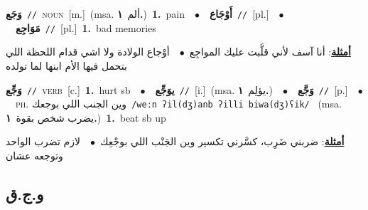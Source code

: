 \documentclass[10pt,a4paper,twoside]{article} %
\begin{document}
\begin{multicols}{2}
{{{{{{{{{{{\setlength\topsep{0pt}\textbf{\foreignlanguage{arabic}{وَجَع}}\ {\color{gray}\texttt{//}\color{black}}\ \textsc{noun}\ [m.]\ \color{gray}(msa. \foreignlanguage{arabic}{ألم}~\foreignlanguage{arabic}{\textbf{١.}})\color{black}\ \textbf{1.}~pain\ \ $\bullet$\ \ \setlength\topsep{0pt}\textbf{\foreignlanguage{arabic}{أَوْجَاع}}\ {\color{gray}\texttt{//}\color{black}}\ [pl.]\ \ $\bullet$\ \ \setlength\topsep{0pt}\textbf{\foreignlanguage{arabic}{مَوَاجِع}}\ {\color{gray}\texttt{//}\color{black}}\ [pl.]\ \textbf{1.}~bad memories\  \begin{flushright}\color{gray}\foreignlanguage{arabic}{\textbf{\underline{\foreignlanguage{arabic}{أمثلة}}}: أنا آسف لأني قلَّبت عليك المواجِع\ $\bullet$\ \  أوْجاع الولادة ولا اشي قدام اللحظة اللي بتحمل فيها الأم ابنها لما تولده}\end{flushright}\color{black}} \vspace{2mm}

{\setlength\topsep{0pt}\textbf{\foreignlanguage{arabic}{وَجِّع}}\ {\color{gray}\texttt{//}\color{black}}\ \textsc{verb}\ [c.]\ \textbf{1.}~hurt sb\ \ $\bullet$\ \ \setlength\topsep{0pt}\textbf{\foreignlanguage{arabic}{يوَجِّع}}\ {\color{gray}\texttt{//}\color{black}}\ [i.]\ \color{gray}(msa. \foreignlanguage{arabic}{يؤلِم}~\foreignlanguage{arabic}{\textbf{١.}})\color{black}\ \ $\bullet$\ \ \setlength\topsep{0pt}\textbf{\foreignlanguage{arabic}{وَجَّع}}\ {\color{gray}\texttt{//}\color{black}}\ [p.]\ \ $\bullet$\ \ \textsc{ph.} \color{gray} \foreignlanguage{arabic}{وين الجنب اللي بوجعك}\color{black}\ {\color{gray}\texttt{/{\sffamily weːn ʔil(dʒ)anb ʔilli biwa(dʒ)ʕik}/}\color{black}}\ \color{gray} (msa. \foreignlanguage{arabic}{يضرب شخص بقوة}~\foreignlanguage{arabic}{\textbf{١.}})\color{black}\ \textbf{1.}~beat sb up\  \begin{flushright}\color{gray}\foreignlanguage{arabic}{\textbf{\underline{\foreignlanguage{arabic}{أمثلة}}}: ضربني ضَرِب، كسَّرني تكسير وين الجَنْب اللي بوجْعِك\ $\bullet$\ \  لازم تضرب الواحد وتوجعه عشان}\end{flushright}\color{black}} \vspace{2mm}

\vspace{-3mm}
\subsection*{\color{blue}\foreignlanguage{arabic}{و.ج.ق}\color{blue}{}} 

}}}}}}}}}}
\end{multicols}
\end{document}
